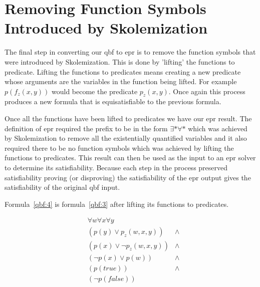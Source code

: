 \section{Removing Function Symbols Introduced by Skolemization}
The final step in converting our \gls{qbf} to \gls{epr} is to remove the function symbols that were introduced by Skolemization. This is done by 'lifting' the functions to predicate. Lifting the functions to predicates means creating a new predicate whose arguments are the variables in the function being lifted. For example $p(f_z(x, y))$ would become the predicate $p_z(x, y)$. Once again this process produces a new formula that is equisatisfiable to the previous formula.

Once all the functions have been lifted to predicates we have our \gls{epr} result. The definition of \gls{epr} required the prefix to be in the form $\exists * \forall *$ which was achieved by Skolemization to remove all the existentially quantified variables and it also required there to be no function symbols which was achieved by lifting the functions to predicates. This result can then be used as the input to an \gls{epr} solver to determine its satisfiability. Because each step in the process preserved satisfiability proving (or disproving) the satisfiability of the \gls{epr} output gives the satisfiability of the original \gls{qbf} input.

Formula~\ref{qbf:4} is formula~\ref{qbf:3} after lifting its functions to predicates.

\begin{equation} \label{qbf:4}
\begin{aligned}
&\forall w \forall x \forall y\\
&(p(y) \lor p_z(w, x, y)) &\land\\
&(p(x) \lor \neg p_z(w, x, y)) &\land\\
&(\neg p(x) \lor p(w)) &\land\\
&(p(true)) &\land\\
&(\neg p(false))
\end{aligned}
\end{equation}

